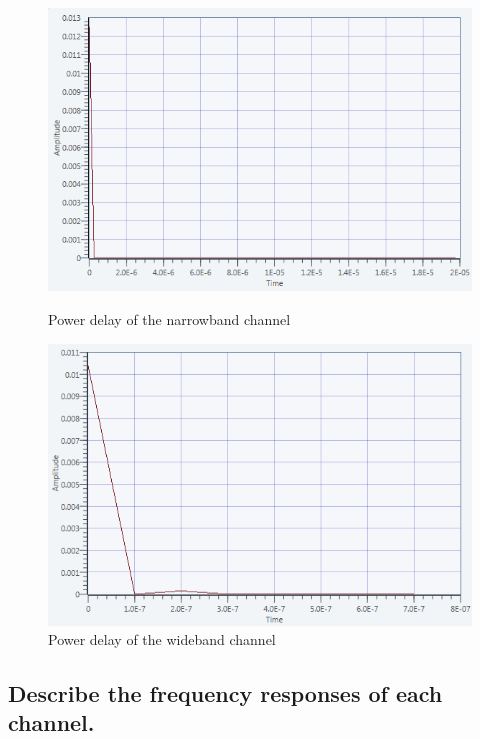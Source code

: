 \documentclass[frenchb, oneside, headings=normal]{scrartcl}
\begin{document}
\begin{figure}[!ht]
    \begin{minipage}[b]{0.48\linewidth}
        \centering \includegraphics[scale=0.45]{img/power_delay_narrow.png}
     \caption{Power delay of the narrowband channel}
     \label{fig4}
    \end{minipage}\hfill
    \begin{minipage}[b]{0.48\linewidth}
         \centering \includegraphics[scale=0.45]{img/power_delay_wideband.png}
 \caption{Power delay of the wideband channel}\label{fig5}
    \end{minipage}
\end{figure}


\subsection{Describe the frequency responses of each channel.}
\end{document}
